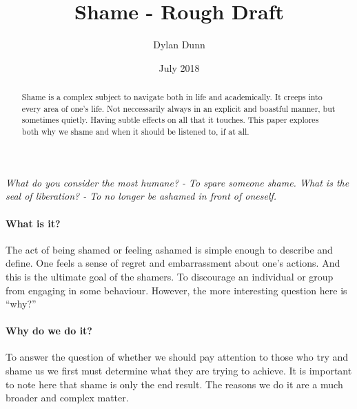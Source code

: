 \documentclass[12pt, a4paper]{article}
\title{Shame - Rough Draft}
\author{Dylan Dunn}
\date{July 2018}
\begin{document}
\maketitle

\begin{center}
    \emph{What do you consider the most humane? - To spare someone shame. What is the seal of liberation? - To no longer be ashamed in front of oneself.}
\end{center}

\begin{abstract}
Shame is a complex subject to navigate both in life and academically. 
It creeps into every area of one's life. 
Not neccessarily always in an explicit and boastful manner, but sometimes quietly. 
Having subtle effects on all that it touches. This paper explores both why we shame
and when it should be listened to, if at all. 
\end{abstract}

\paragraph{What is it?}
The act of being shamed or feeling ashamed is simple enough to describe and define. 
One feels a sense of regret and embarrassment about one's actions. And this is the ultimate goal of the shamers.
To discourage an individual or group from engaging in some behaviour. 
However, the more interesting question here is ``why?''

\paragraph{Why do we do it?}
To answer the question of whether we should pay attention to those who try and shame us we first must determine what 
they are trying to achieve. 
It is important to note here that shame is only the end result. The reasons we do it are a much broader and complex matter.
\end{document}

